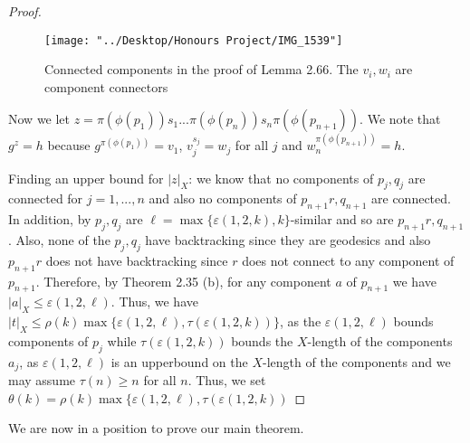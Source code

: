 \documentclass[12pt]{article}
\newcommand{\vs}{\vskip10pt}
\begin{document}
\begin{proof}
\begin{figure} [H]
	\centering
	\texttt{[image: "../Desktop/Honours Project/IMG\_1539"]}
	\caption{Connected components in the proof of Lemma 2.66. The $v_i, w_i$ are component connectors}
	\label{fig:img1539}
\end{figure}
		
		\vs 
		
		Now we let $z = \pi(\phi(p_1)) s_1 ... \pi(\phi(p_n)) s_n \pi(\phi(p_{n+1}))$. We note that $g^z = h$ because $g^{\pi(\phi(p_1))} = v_1$, $v_j^{s_j} = w_j$ for all $j$ and $w_n^{\pi(\phi(p_{n+1}))} = h$. 
		
		\vs 
		
		Finding an upper bound for $\vert z \vert_X$: we know that no components of $p_j, q_j$ are connected for $j =1,...,n$ and also no components of $p_{n+1}r, q_{n+1}$ are connected. In addition, by $p_j, q_j$ are $\ell = \max \{\varepsilon(1,2,k), k\}$-similar and so are $p_{n+1}r, q_{n+1}$. Also, none of the $p_j, q_j$ have backtracking since they are geodesics and also $p_{n+1}r$ does not have backtracking since $r$ does not connect to any component of $p_{n+1}$. Therefore, by Theorem 2.35 (b), for any component $a$ of $p_{n+1}$ we have $\vert a \vert_X \leq \varepsilon(1,2,\ell)$. Thus, we have $\vert t \vert_X \leq \rho(k) \max \{\varepsilon(1,2,\ell), \tau(\varepsilon(1,2,k))\}$, as the $\varepsilon(1,2,\ell)$ bounds components of $p_j$ while $\tau(\varepsilon(1,2,k))$ bounds the $X$-length of the components $a_j$, as $\varepsilon(1,2,\ell)$ is an upperbound on the $X$-length of the components and we may assume $\tau(n) \geq n$ for all $n$. Thus, we set $\theta(k) = \rho(k) \max \{\varepsilon(1,2,\ell), \tau(\varepsilon(1,2,k))$
		
	\end{proof}

	We are now in a position to prove our main theorem. 
	
\end{document}
